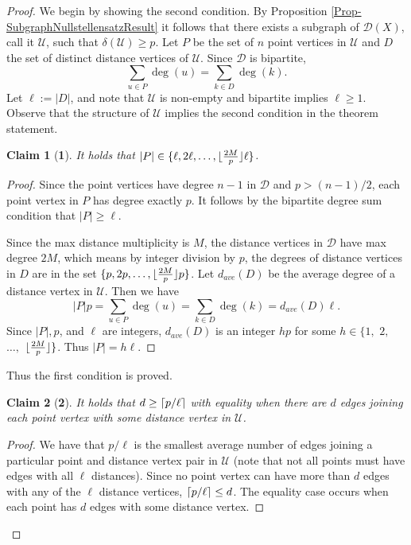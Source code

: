 \documentclass[12pt]{article}
\DeclarePairedDelimiter\ceil{\lceil}{\rceil}
\DeclarePairedDelimiter\floor{\lfloor}{\rfloor}
\newtheorem*{claim}{Claim}
\theoremstyle{definition}
\begin{document}
	\begin{proof}
		We begin by showing the second condition.  By Proposition \ref{Prop-SubgraphNullstellensatzResult} it follows that there exists a subgraph of $\mathcal{D}(X)$, call it $\mathcal{U}$, such that $\delta(\mathcal{U}) \geq p$.  Let $P$ be the set of $n$ point vertices in $\mathcal{U}$ and $D$ the set of distinct distance vertices of $\mathcal{U}$.  Since $\mathcal{D}$ is bipartite, 
		$$\sum_{u \in P}\deg(u) = \sum_{k \in D}\deg(k).$$
		Let $\ell := |D|$, and note that $\mathcal{U}$ is non-empty and bipartite implies $\ell \geq 1$.  Observe that the structure of $\mathcal{U}$ implies the second condition in the theorem statement.
		\begin{claim}[\textbf{1}]
			It holds that $|P| \in \{\ell, 2\ell, \ldots, \floor{\tfrac{2M}{p}}\ell\}$.
		\end{claim}
		\begin{proof}
			Since the point vertices have degree $n-1$ in $\mathcal{D}$ and $p > (n-1)/2$, each point vertex in $P$ has degree exactly $p$.  It follows by the bipartite degree sum condition that $|P| \geq \ell$.  
		
			Since the max distance multiplicity is $M$, the distance vertices in $\mathcal{D}$ have max degree $2M$, which means by integer division by $p$, the degrees of distance vertices in $D$ are in the set $\{p, 2p, \ldots, \floor{\tfrac{2M}{p}}p\}$.  %
			Let $d_{ave}(D)$ be the average degree of a distance vertex in $\mathcal{U}$.  Then we have
			$$|P| p = \sum_{u \in P}\deg(u) = \sum_{k \in D}\deg(k) = d_{ave}(D)\ell.$$
			Since $|P|, p$, and $\ell$ are integers, $d_{ave}(D)$ is an integer $hp$ for some $h \in \{1,$ $2,$ $\ldots,$ $\floor{\tfrac{2M}{p}}\}$.  Thus $|P| = h\ell$.
		\end{proof}
		Thus the first condition is proved.
		
		\begin{claim}[\textbf{2}]
			It holds that $d \geq \ceil{p/\ell}$ with equality when there are $d$ edges joining each point vertex with some distance vertex in $\mathcal{U}$.
		\end{claim}
		\begin{proof}
			We have that $p/\ell$ is the smallest average number of edges joining a particular point and distance vertex pair in $\mathcal{U}$ (note that not all points must have edges with all $\ell$ distances).  Since no point vertex can have more than $d$ edges with any of the $\ell$ distance vertices, $\ceil{p/\ell} \leq d$.  The equality case occurs when each point has $d$ edges with some distance vertex.
		\end{proof}
	

\end{proof}
\end{document}
